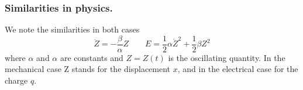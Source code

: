 \documentclass[../../../main.tex]{subfiles}
\begin{document}
\subsubsection{Similarities in physics.} We note the similarities in both cases 
\begin{equation*}
    \ddot{Z}=-\frac{\beta}{\alpha}Z\qquad E=\frac{1}{2}\alpha\dot{Z}^2+\frac{1}{2}\beta Z^2
\end{equation*}
where $\alpha$ and $\alpha$ are constants and $Z = Z(t)$ is the oscillating quantity. In the mechanical case Z stands for the displacement $x$, and in the electrical case for the charge $q$.
\end{document}
